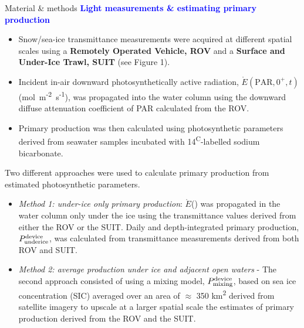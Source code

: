 \documentclass[final]{beamer}
\newlength{\colwidth}
\newcommand{\eparzero}{\ensuremath{\mathring{E}(\text{PAR}, 0^+, t)}}
\newcommand{\micromol}{\textmu mol~m\textsuperscript{-2}~s\textsuperscript{-1}}
\newcommand{\eparscalar}{\ensuremath{\mathring{E}}(\text{PAR})}
\newcommand{\ppundericedevice}{\ensuremath{P_{\text{\scriptsize underice}}^{\text{\scriptsize device}}}}
\newcommand{\ppmixingdevice}{\ensuremath{P_{\text{\scriptsize mixing}}^{\text{\scriptsize device}}}}
\begin{document}
\begin{frame}[t]
\begin{columns}[t]
\begin{column}{\colwidth}
\begin{block}{\small Material \& methods}
				\textcolor{blue}{\textbf{Light measurements \& estimating primary production}}

				\begin{itemize}
					\justifying
					\item Snow/sea-ice transmittance measurements were acquired at different spatial scales using a \textbf{Remotely Operated Vehicle, ROV} and a \textbf{Surface and Under-Ice Trawl, SUIT} (see Figure 1).
					\item Incident in-air downward photosynthetically active radiation, \eparzero{} (\micromol{}), was propagated into the water column using the downward diffuse attenuation coefficient of PAR calculated from the ROV.
					\item Primary production was then calculated using photosynthetic parameters derived from seawater samples incubated with 14\textsuperscript{C}-labelled sodium bicarbonate.
				\end{itemize}

				Two different approaches were used to calculate primary production from estimated photosynthetic parameters.

				\begin{itemize}
					\justifying
					\item \textit{Method 1: under-ice only primary production}: \eparscalar{} was propagated in the water column only under the ice using the transmittance values derived from either the ROV or the SUIT. Daily and depth-integrated primary production, \ppundericedevice{}, was calculated from transmittance measurements derived from both ROV and SUIT.
					\item \textit{Method 2: average production under ice and adjacent open waters} - The second approach consisted of using a mixing model, \ppmixingdevice{}, based on sea ice concentration (SIC) averaged over an area of $\approx$ 350 km\textsuperscript{2} derived from satellite imagery to upscale at a larger spatial scale the estimates of primary production derived from the ROV and the SUIT.
				\end{itemize}
			\end{block}


\end{column}
\end{columns}
\end{frame}
\end{document}
